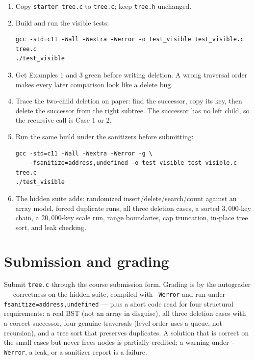 \documentclass[11pt]{article}
\begin{document}
\begin{enumerate}
  \item Copy \texttt{starter\_tree.c} to \texttt{tree.c}; keep \texttt{tree.h} unchanged.
  \item Build and run the visible tests:
\begin{verbatim}
gcc -std=c11 -Wall -Wextra -Werror -o test_visible test_visible.c tree.c
./test_visible
\end{verbatim}
  \item Get Examples 1 and 3 green before writing deletion. A wrong traversal order makes every later comparison look like a delete bug.
  \item Trace the two-child deletion on paper: find the successor, copy its key, then delete the successor from the right subtree. The successor has no left child, so the recursive call is Case 1 or 2.
  \item Run the same build under the sanitizers before submitting:
\begin{verbatim}
gcc -std=c11 -Wall -Wextra -Werror -g \
    -fsanitize=address,undefined -o test_visible test_visible.c tree.c
./test_visible
\end{verbatim}
  \item The hidden suite adds: randomized insert/delete/search/count against an array model, forced duplicate runs, all three deletion cases, a sorted $3{,}000$-key chain, a $20{,}000$-key scale run, range boundaries, cap truncation, in-place tree sort, and leak checking.
\end{enumerate}

\section{Submission and grading}

Submit \texttt{tree.c} through the course submission form. Grading is by the autograder --- correctness on the hidden suite, compiled with \texttt{-Werror} and run under \texttt{-fsanitize=address,undefined} --- plus a short code read for four structural requirements: a real BST (not an array in disguise), all three deletion cases with a correct successor, four genuine traversals (level order uses a queue, not recursion), and a tree sort that preserves duplicates. A solution that is correct on the small cases but never frees nodes is partially credited; a warning under \texttt{-Werror}, a leak, or a sanitizer report is a failure.



\end{document}
